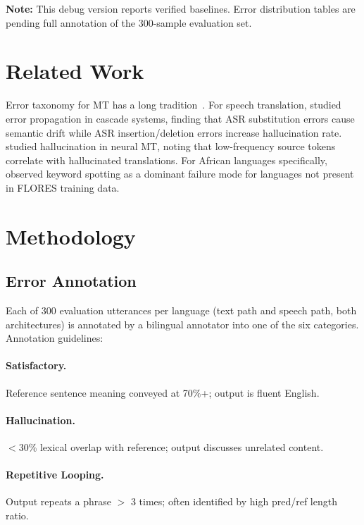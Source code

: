 \documentclass[11pt,a4paper]{article}
\begin{document}
\textbf{Note:} This debug version reports verified baselines. Error distribution tables are pending full annotation of the 300-sample evaluation set.

\section{Related Work}
\label{sec:related}

Error taxonomy for MT has a long tradition~\citep{vilar2006error}. For speech translation, \citet{sperber2017cascade} studied error propagation in cascade systems, finding that ASR substitution errors cause semantic drift while ASR insertion/deletion errors increase hallucination rate. \citet{li2021hallucination} studied hallucination in neural MT, noting that low-frequency source tokens correlate with hallucinated translations. For African languages specifically, \citet{nekoto2020participatory} observed keyword spotting as a dominant failure mode for languages not present in FLORES training data.

\section{Methodology}
\label{sec:method}

\subsection{Error Annotation}
Each of 300 evaluation utterances per language (text path and speech path, both architectures) is annotated by a bilingual annotator into one of the six categories. Annotation guidelines:

\paragraph{Satisfactory.} Reference sentence meaning conveyed at 70\%+; output is fluent English.

\paragraph{Hallucination.} $<$30\% lexical overlap with reference; output discusses unrelated content.

\paragraph{Repetitive Looping.} Output repeats a phrase $>$ 3 times; often identified by high pred/ref length ratio.
\end{document}
